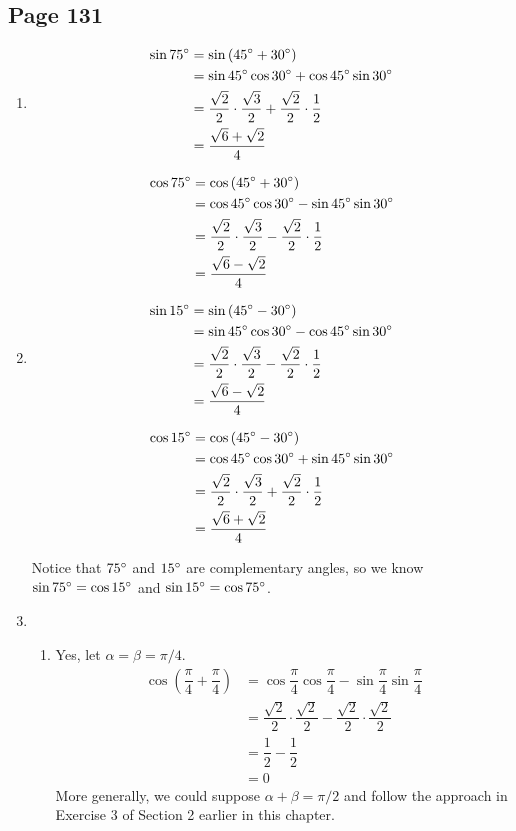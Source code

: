 \documentclass{article}
\newenvironment{solutions}[1]
{\subsection*{#1}
 \begin{enumerate}[leftmargin=1.5em]}
{\end{enumerate}}
\newcommand{\solution}{\item}
\newenvironment{subsolutions}
{\begin{enumerate}}
{\end{enumerate}}
\newcommand{\subsolution}{\item}
\begin{document}
\begin{solutions}{Page 131}
\solution %
\begin{align*}
\sin{75\degree} &= \sin\left(45\degree + 30\degree\right) \\
&= \sin{45\degree}\cos{30\degree} + \cos{45\degree}\sin{30\degree} \\
&= \dfrac{\sqrt{2}}{2} \cdot \dfrac{\sqrt{3}}{2} + \dfrac{\sqrt{2}}{2} \cdot \dfrac{1}{2} \\
&= \dfrac{\sqrt{6}+\sqrt{2}}{4}
\end{align*}

\begin{align*}
\cos{75\degree} &= \cos\left(45\degree + 30\degree\right) \\
&= \cos{45\degree}\cos{30\degree} - \sin{45\degree}\sin{30\degree} \\
&= \dfrac{\sqrt{2}}{2} \cdot \dfrac{\sqrt{3}}{2} - \dfrac{\sqrt{2}}{2} \cdot \dfrac{1}{2} \\
&= \dfrac{\sqrt{6}-\sqrt{2}}{4}
\end{align*}

\solution %
\begin{align*}
\sin{15\degree} &= \sin\left(45\degree - 30\degree\right) \\
&= \sin{45\degree}\cos{30\degree} - \cos{45\degree}\sin{30\degree} \\
&= \dfrac{\sqrt{2}}{2} \cdot \dfrac{\sqrt{3}}{2} - \dfrac{\sqrt{2}}{2} \cdot \dfrac{1}{2} \\
&= \dfrac{\sqrt{6}-\sqrt{2}}{4}
\end{align*}

\begin{align*}
\cos{15\degree} &= \cos\left(45\degree - 30\degree\right) \\
&= \cos{45\degree}\cos{30\degree} + \sin{45\degree}\sin{30\degree} \\
&= \dfrac{\sqrt{2}}{2} \cdot \dfrac{\sqrt{3}}{2} + \dfrac{\sqrt{2}}{2} \cdot \dfrac{1}{2} \\
&= \dfrac{\sqrt{6}+\sqrt{2}}{4}
\end{align*}

Notice that $75\degree$ and $15\degree$ are complementary angles, so we know $\sin{75\degree}=\cos{15\degree}$ and $\sin{15\degree}=\cos{75\degree}$.

\solution %
\begin{subsolutions}
\subsolution %
Yes, let $\alpha = \beta = \pi/4$.
\begin{align*}
\cos\left(\dfrac{\pi}{4} + \dfrac{\pi}{4}\right) &= \cos{\dfrac{\pi}{4}}\cos{\dfrac{\pi}{4}} - \sin{\dfrac{\pi}{4}}\sin{\dfrac{\pi}{4}} \\
&= \dfrac{\sqrt{2}}{2} \cdot \dfrac{\sqrt{2}}{2} - \dfrac{\sqrt{2}}{2} \cdot \dfrac{\sqrt{2}}{2} \\
&= \dfrac{1}{2} - \dfrac{1}{2} \\
&= 0
\end{align*}
More generally, we could suppose $\alpha + \beta = \pi/2$ and follow the approach in Exercise 3 of Section 2 earlier in this chapter.


\end{subsolutions}
\end{solutions}
\end{document}
